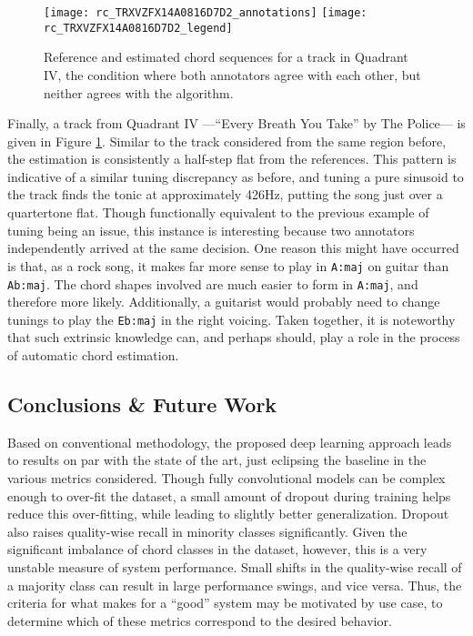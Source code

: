\begin{figure}[t!]
\centering
\texttt{[image: rc\_TRXVZFX14A0816D7D2\_annotations]}
\texttt{[image: rc\_TRXVZFX14A0816D7D2\_legend]}
\caption{Reference and estimated chord sequences for a track in Quadrant IV, the condition where both annotators agree with each other, but neither agrees with the algorithm.}
\label{fig:rc_quadIV}
\end{figure}

Finally, a track from Quadrant IV ---``Every Breath You Take'' by The Police--- is given in Figure \ref{fig:rc_quadIV}.
Similar to the track considered from the same region before, the estimation is consistently a half-step flat from the references.
This pattern is indicative of a similar tuning discrepancy as before, and tuning a pure sinusoid to the track finds the tonic at approximately 426Hz, putting the song just over a quartertone flat.
Though functionally equivalent to the previous example of tuning being an issue, this instance is interesting because two annotators independently arrived at the same decision.
One reason this might have occurred is that, as a rock song, it makes far more sense to play in \texttt{A:maj} on guitar than \texttt{Ab:maj}.
The chord shapes involved are much easier to form in \texttt{A:maj}, and therefore more likely.
Additionally, a guitarist would probably need to change tunings to play the \texttt{Eb:maj} in the right voicing.
Taken together, it is noteworthy that such extrinsic knowledge can, and perhaps should, play a role in the process of automatic chord estimation.



\subsection{Conclusions \& Future Work}
\label{subsec:conclusions}

Based on conventional methodology, the proposed deep learning approach leads to results on par with the state of the art, just eclipsing the baseline in the various metrics considered.
Though fully convolutional models can be complex enough to over-fit the dataset, a small amount of dropout during training helps reduce this over-fitting, while leading to slightly better generalization.
Dropout also raises quality-wise recall in minority classes significantly.
Given the significant imbalance of chord classes in the dataset, however, this is a very unstable measure of system performance.
Small shifts in the quality-wise recall of a majority class can result in large performance swings, and vice versa.
Thus, the criteria for what makes for a ``good'' system may be motivated by use case, to determine which of these metrics correspond to the desired behavior.

